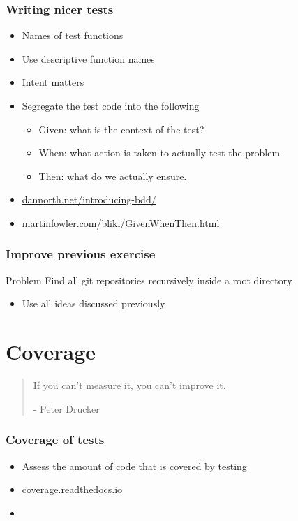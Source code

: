 \documentclass[14pt,compress]{beamer}
\begin{document}
\begin{frame}
  \frametitle{Writing nicer tests}
  \begin{itemize}
  \item Names of test functions
  \item Use descriptive function names
  \item Intent matters
  \item Segregate the test code into the following

    \begin{itemize}
    \item Given: what is the context of the test?
    \item When: what action is taken to actually test the problem
    \item Then: what do we actually ensure.
    \end{itemize}

  \item \url{dannorth.net/introducing-bdd/}
  \item \url{martinfowler.com/bliki/GivenWhenThen.html}
  \end{itemize}
\end{frame}

\begin{frame}
  \frametitle{Improve previous exercise}
  \begin{block}{Problem}
  Find all git repositories recursively inside a root directory
\end{block}
\begin{itemize}
  \item Use all ideas discussed previously
\end{itemize}

\end{frame}

\section{Coverage}

\begin{frame}
  \Large
 \begin{quote}
   If you can't measure it, you can't improve it.

   \vspace*{0.5in}
   \hfill - Peter Drucker
  \end{quote}
\end{frame}

\begin{frame}
  \frametitle{Coverage of tests}
  \begin{itemize}
    \item Assess the amount of code that is covered by testing
    \item \url{coverage.readthedocs.io}
    \item {}
  \end{itemize}
\end{frame}
\end{document}
